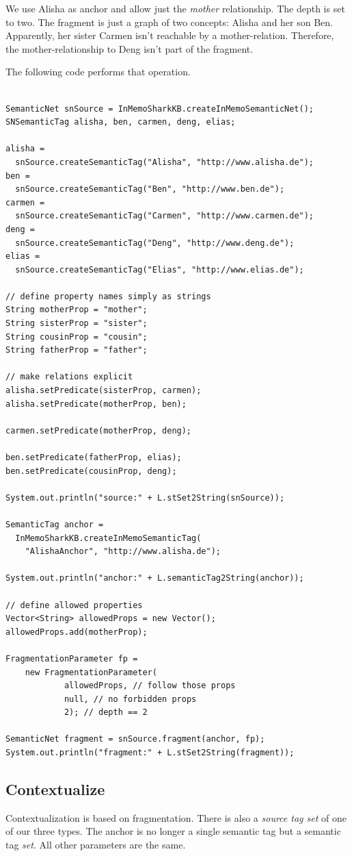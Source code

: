 We use Alisha as anchor and allow just the {\it mother} relationship. The depth is set to two. The fragment is just a graph of two concepts: Alisha and her son Ben. Apparently, her sister Carmen isn't reachable by a mother-relation. Therefore, the mother-relationship to Deng isn't part of the fragment.

The following code performs that operation.

\begin{verbatim}

SemanticNet snSource = InMemoSharkKB.createInMemoSemanticNet();
SNSemanticTag alisha, ben, carmen, deng, elias;

alisha = 
  snSource.createSemanticTag("Alisha", "http://www.alisha.de");
ben = 
  snSource.createSemanticTag("Ben", "http://www.ben.de");
carmen = 
  snSource.createSemanticTag("Carmen", "http://www.carmen.de");
deng = 
  snSource.createSemanticTag("Deng", "http://www.deng.de");
elias = 
  snSource.createSemanticTag("Elias", "http://www.elias.de");

// define property names simply as strings
String motherProp = "mother";
String sisterProp = "sister";
String cousinProp = "cousin";
String fatherProp = "father";

// make relations explicit
alisha.setPredicate(sisterProp, carmen);
alisha.setPredicate(motherProp, ben);

carmen.setPredicate(motherProp, deng);

ben.setPredicate(fatherProp, elias);
ben.setPredicate(cousinProp, deng);

System.out.println("source:" + L.stSet2String(snSource));

SemanticTag anchor = 
  InMemoSharkKB.createInMemoSemanticTag(
    "AlishaAnchor", "http://www.alisha.de");

System.out.println("anchor:" + L.semanticTag2String(anchor));

// define allowed properties
Vector<String> allowedProps = new Vector();
allowedProps.add(motherProp);

FragmentationParameter fp = 
    new FragmentationParameter(
            allowedProps, // follow those props
            null, // no forbidden props
            2); // depth == 2

SemanticNet fragment = snSource.fragment(anchor, fp);
System.out.println("fragment:" + L.stSet2String(fragment));
\end{verbatim}

\subsection{Contextualize}
Contextualization is based on fragmentation. There is also a {\it source tag set} of one of our three types. The anchor is no longer a single semantic tag but a semantic tag {\it set}. All other parameters are the same.

